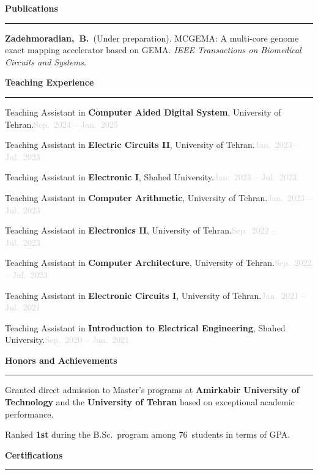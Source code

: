 \documentclass[11pt,a4paper]{article}
\newcommand{\cvsection}[2]{%
  \vspace{0.35cm}%
  \noindent\textcolor{sectiongray}{%
    {\fontsize{11.5pt}{14pt}\selectfont\textbf{#1}}%
    \hspace{0.45em}%
    \textcolor{sectiongray!50}{\rule[0.55ex]{#2\linewidth}{0.45pt}}%
  }%
  \vspace{0.18cm}%
}
\newcommand{\taentry}[3]{%
  \item Teaching Assistant in \textbf{#1}, #2.\hfill\textcolor{lightgray}{#3}%
}
\begin{document}
\cvsection{Publications}{0.858}

\footnotesize
\begin{cvlist}
  \item \textbf{Zadehmoradian,~B.}\ (Under preparation).
        MCGEMA: A multi-core genome exact mapping accelerator based on GEMA\@.
        \textit{IEEE Transactions on Biomedical Circuits and Systems}.
\end{cvlist}

\cvsection{Teaching Experience}{0.765}

\footnotesize
\begin{cvlist}
  \taentry{Computer Aided Digital System}{University of Tehran}{Sep.~2024 -- Jan.~2025}
  \taentry{Electric Circuits II}{University of Tehran}{Jan.~2023 -- Jul.~2023}
  \taentry{Electronic I}{Shahed University}{Jan.~2023 -- Jul.~2023}
  \taentry{Computer Arithmetic}{University of Tehran}{Jan.~2023 -- Jul.~2023}
  \taentry{Electronics II}{University of Tehran}{Sep.~2022 -- Jul.~2023}
  \taentry{Computer Architecture}{University of Tehran}{Sep.~2022 -- Jul.~2023}
  \taentry{Electronic Circuits I}{University of Tehran}{Jan.~2021 -- Jul.~2021}
  \taentry{Introduction to Electrical Engineering}{Shahed University}{Sep.~2020 -- Jan.~2021}
\end{cvlist}

\cvsection{Honors and Achievements}{0.71}

\footnotesize
\begin{cvlist}
  \item Granted direct admission to Master's programs at \textbf{Amirkabir University of Technology}
        and the \textbf{University of Tehran} based on exceptional academic performance.
  \item Ranked \textbf{1st} during the B.Sc.\ program among 76~students in terms of GPA.
\end{cvlist}

\cvsection{Certifications}{0.84}
\end{document}
